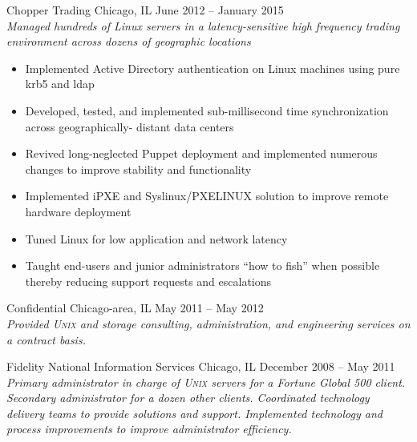 \documentclass[9pt]{extarticle} %
\begin{document}
\begin{indented}
	Chopper Trading \tab Chicago, IL \tab June 2012 -- January 2015\\
	\textit{Managed hundreds of Linux servers in a latency-sensitive high frequency trading environment across dozens of geographic locations}
	\begin{itemize}
		\item Implemented Active Directory authentication on Linux machines using pure krb5 and ldap
		\item Developed, tested, and implemented sub-millisecond time synchronization across geographically- distant data centers
		\item Revived long-neglected Puppet deployment and implemented numerous changes to improve stability and functionality
		\item Implemented iPXE and Syslinux/PXELINUX solution to improve remote hardware deployment
		\item Tuned Linux for low application and network latency
		\item Taught end-users and junior administrators ``how to fish'' when possible thereby reducing support requests and escalations
	\end{itemize}
\end{indented}

\bigskip



\begin{indented}
	Confidential \tab Chicago-area, IL \tab May 2011 -- May 2012\\
	\textit{Provided \textsc{Unix} and storage consulting, administration, and engineering services on a contract basis.}
\end{indented}

\bigskip



\begin{indented}
	Fidelity National Information Services \tab Chicago, IL \tab December 2008 -- May 2011\\
	\textit{Primary administrator in charge of \textsc{Unix} servers for a Fortune Global 500 client. Secondary administrator for a dozen other clients. Coordinated technology delivery teams to provide solutions and support. Implemented technology and process improvements to improve administrator efficiency.}
\end{indented}
\end{document}
